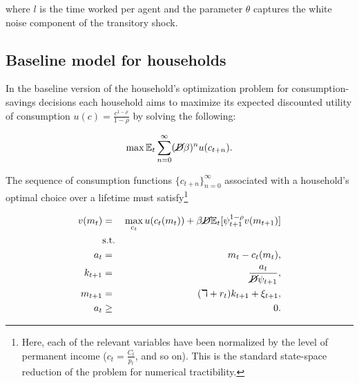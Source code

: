 \documentclass[\econtexRoot/Chp1proposal]{subfiles}
\begin{document}
\par where $l$ is the time worked per agent and the parameter $\theta$ captures the white noise component of the transitory shock.

\subsection{Baseline model for households}

\par In the baseline version of the household's optimization problem for consumption-savings decisions each household aims to maximize its expected discounted utility of consumption $u(c) = \frac{c^{1-\rho}}{1-\rho}$ by solving the following:

$$ \max \mathbb{E}_t \sum_{n=0}^{\infty}(\cancel{D}\beta)^{n} u(c_{t+n}). $$

\par The sequence of consumption functions $\{c_{t+n}\}^{\infty}_{n=0}$ associated with a household's optimal choice over a lifetime must satisfy\footnote{Here, each of the relevant variables have been normalized by the level of permanent income ($c_t = \frac{C_t}{p_t}$, and so on). This is the standard state-space reduction of the problem for numerical tractibility.} 

\begin{eqnarray*}
  v(m_t) &=& \max_{c_t} u(c_t(m_t)) + \beta \cancel{D} \mathbb{E}_{t}[\psi_{t+1}^{1-\rho}v(m_{t+1})] \\
  &\text{s.t.}& \\
  a_t &=& m_t - c_t(m_t), \\
  k_{t+1} &=& \frac{a_t}{\cancel{D}\psi_{t+1}}, \\
  m_{t+1} &=& (\daleth + r_t)k_{t+1} + \xi_{t+1}, \\
  a_t &\geq& 0.
\end{eqnarray*}

\onlyinsubfile{}

\end{document}
